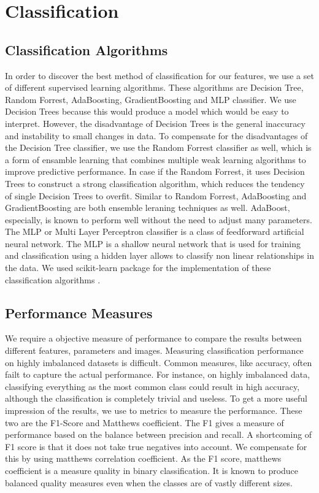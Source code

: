 \section{Classification}


\subsection{Classification Algorithms}
In order to discover the best method of classification for our features, we use a set of different supervised learning algorithms. These algorithms are Decision Tree, Random Forrest, AdaBoosting, GradientBoosting and MLP classifier. We use Decision Trees because this would produce a model which would be easy to interpret. However, the disadvantage of Decision Trees is the general inaccuracy and instability to small changes in data. To compensate for the disadvantages of the Decision Tree classifier, we use the Random Forrest classifier as well, which is a form of ensamble learning that combines multiple weak learning algorithms to improve predictive performance. In case if the Random Forrest, it uses Decision Trees to construct a strong classification algorithm, which reduces the tendency of single Decision Trees to overfit. Similar to Random Forrest, AdaBoosting and GradientBoosting are both ensemble leraning techniques as well. AdaBoost, especially, is known to perform well without the need to adjust many parameters. The MLP  or Multi Layer Perceptron classifier is a class of feedforward artificial neural network. The MLP is a shallow neural network that is used for training and classification using a hidden layer allows to classify non linear relationships in the data. We used scikit-learn package for the implementation of these classification algorithms \cite{scikit-learn}.

\subsection{Performance Measures}
We require a objective measure of performance to compare the results between different features, parameters and images. Measuring classification performance on highly imbalanced datasets is difficult. Common measures, like accuracy, often failt to capture the actual performance. For instance, on highly imbalanced data, classifying everything as the most common class could result in high accuracy, although the classification is completely trivial and useless. To get a more useful impression of the results, we use to metrics to measure the performance. These two are the F1-Score and Matthews coefficient. The F1 gives a measure of performance based on the balance between precision and recall. A shortcoming of F1 score is that it does not take true negatives into account. We compensate for this by using matthews correlation coefficient. As the F1 score, matthews coefficient is a measure quality in binary classification. It is known to produce balanced quality measures even when the classes are of vastly different sizes.

